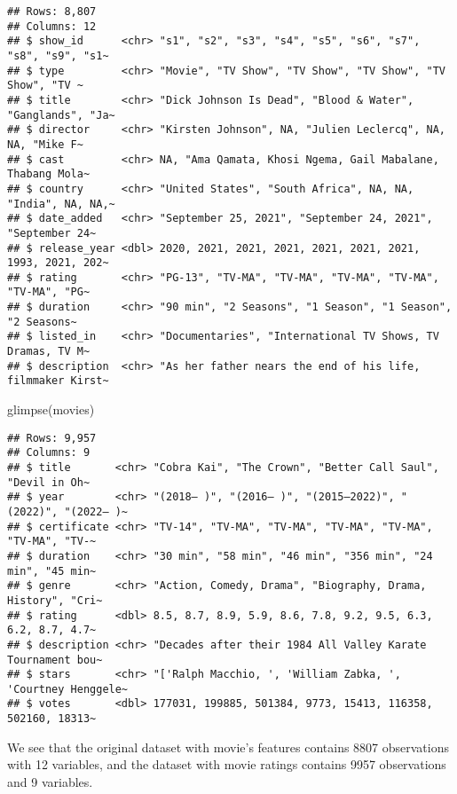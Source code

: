 \documentclass[
]{article}
\newenvironment{Shaded}{\begin{snugshade}}{\end{snugshade}}
\newcommand{\FunctionTok}[1]{\textcolor[rgb]{0.00,0.00,0.00}{#1}}
\newcommand{\NormalTok}[1]{#1}
\begin{document}
\begin{verbatim}
## Rows: 8,807
## Columns: 12
## $ show_id      <chr> "s1", "s2", "s3", "s4", "s5", "s6", "s7", "s8", "s9", "s1~
## $ type         <chr> "Movie", "TV Show", "TV Show", "TV Show", "TV Show", "TV ~
## $ title        <chr> "Dick Johnson Is Dead", "Blood & Water", "Ganglands", "Ja~
## $ director     <chr> "Kirsten Johnson", NA, "Julien Leclercq", NA, NA, "Mike F~
## $ cast         <chr> NA, "Ama Qamata, Khosi Ngema, Gail Mabalane, Thabang Mola~
## $ country      <chr> "United States", "South Africa", NA, NA, "India", NA, NA,~
## $ date_added   <chr> "September 25, 2021", "September 24, 2021", "September 24~
## $ release_year <dbl> 2020, 2021, 2021, 2021, 2021, 2021, 2021, 1993, 2021, 202~
## $ rating       <chr> "PG-13", "TV-MA", "TV-MA", "TV-MA", "TV-MA", "TV-MA", "PG~
## $ duration     <chr> "90 min", "2 Seasons", "1 Season", "1 Season", "2 Seasons~
## $ listed_in    <chr> "Documentaries", "International TV Shows, TV Dramas, TV M~
## $ description  <chr> "As her father nears the end of his life, filmmaker Kirst~
\end{verbatim}

\begin{Shaded}
\begin{Highlighting}[]
\FunctionTok{glimpse}\NormalTok{(movies)}
\end{Highlighting}
\end{Shaded}

\begin{verbatim}
## Rows: 9,957
## Columns: 9
## $ title       <chr> "Cobra Kai", "The Crown", "Better Call Saul", "Devil in Oh~
## $ year        <chr> "(2018– )", "(2016– )", "(2015–2022)", "(2022)", "(2022– )~
## $ certificate <chr> "TV-14", "TV-MA", "TV-MA", "TV-MA", "TV-MA", "TV-MA", "TV-~
## $ duration    <chr> "30 min", "58 min", "46 min", "356 min", "24 min", "45 min~
## $ genre       <chr> "Action, Comedy, Drama", "Biography, Drama, History", "Cri~
## $ rating      <dbl> 8.5, 8.7, 8.9, 5.9, 8.6, 7.8, 9.2, 9.5, 6.3, 6.2, 8.7, 4.7~
## $ description <chr> "Decades after their 1984 All Valley Karate Tournament bou~
## $ stars       <chr> "['Ralph Macchio, ', 'William Zabka, ', 'Courtney Henggele~
## $ votes       <dbl> 177031, 199885, 501384, 9773, 15413, 116358, 502160, 18313~
\end{verbatim}

We see that the original dataset with movie's features contains 8807
observations with 12 variables, and the dataset with movie ratings
contains 9957 observations and 9 variables.
\end{document}
